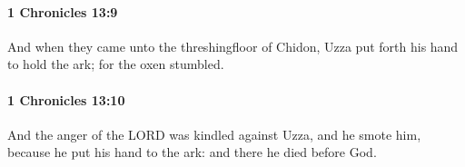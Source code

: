 		\paragraph{1 Chronicles 13:9} %
			\label{1CHRONICLES-13-9}

			And when they came unto the threshingfloor of Chidon, Uzza put forth his hand to hold the ark; for the oxen stumbled.


		\paragraph{1 Chronicles 13:10} %
			\label{1CHRONICLES-13-10}

			And the anger of the LORD was kindled against Uzza, and he smote him, because he put his hand to the ark: and there he died before God.


